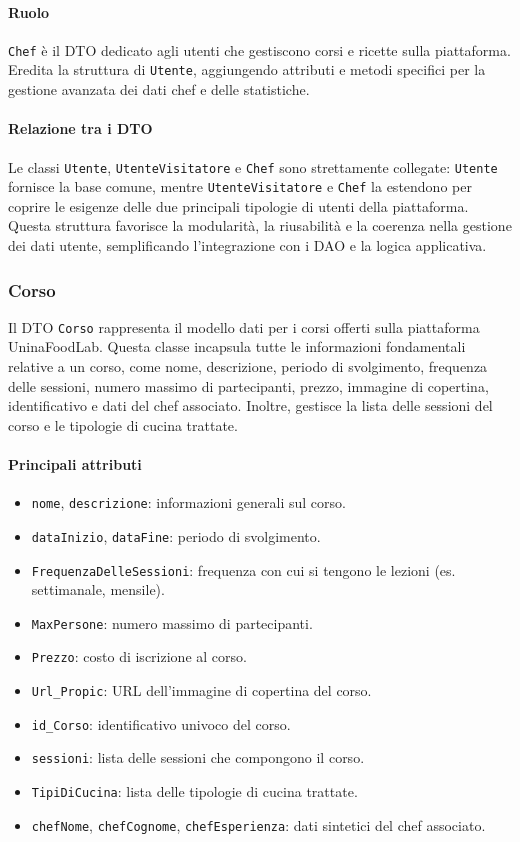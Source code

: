 \paragraph{Ruolo}
\texttt{Chef} è il DTO dedicato agli utenti che gestiscono corsi e ricette sulla piattaforma. Eredita la struttura di \texttt{Utente}, aggiungendo attributi e metodi specifici per la gestione avanzata dei dati chef e delle statistiche.

\paragraph{Relazione tra i DTO}
Le classi \texttt{Utente}, \texttt{UtenteVisitatore} e \texttt{Chef} sono strettamente collegate: \texttt{Utente} fornisce la base comune, mentre \texttt{UtenteVisitatore} e \texttt{Chef} la estendono per coprire le esigenze delle due principali tipologie di utenti della piattaforma. Questa struttura favorisce la modularità, la riusabilità e la coerenza nella gestione dei dati utente, semplificando l'integrazione con i DAO e la logica applicativa.

\subsubsection{Corso}
Il DTO \texttt{Corso} rappresenta il modello dati per i corsi offerti sulla piattaforma UninaFoodLab. Questa classe incapsula tutte le informazioni fondamentali relative a un corso, come nome, descrizione, periodo di svolgimento, frequenza delle sessioni, numero massimo di partecipanti, prezzo, immagine di copertina, identificativo e dati del chef associato. Inoltre, gestisce la lista delle sessioni del corso e le tipologie di cucina trattate.

\paragraph{Principali attributi}
\begin{itemize}
    \item \texttt{nome}, \texttt{descrizione}: informazioni generali sul corso.
    \item \texttt{dataInizio}, \texttt{dataFine}: periodo di svolgimento.
    \item \texttt{FrequenzaDelleSessioni}: frequenza con cui si tengono le lezioni (es. settimanale, mensile).
    \item \texttt{MaxPersone}: numero massimo di partecipanti.
    \item \texttt{Prezzo}: costo di iscrizione al corso.
    \item \texttt{Url\_Propic}: URL dell'immagine di copertina del corso.
    \item \texttt{id\_Corso}: identificativo univoco del corso.
    \item \texttt{sessioni}: lista delle sessioni che compongono il corso.
    \item \texttt{TipiDiCucina}: lista delle tipologie di cucina trattate.
    \item \texttt{chefNome}, \texttt{chefCognome}, \texttt{chefEsperienza}: dati sintetici del chef associato.
\end{itemize}

